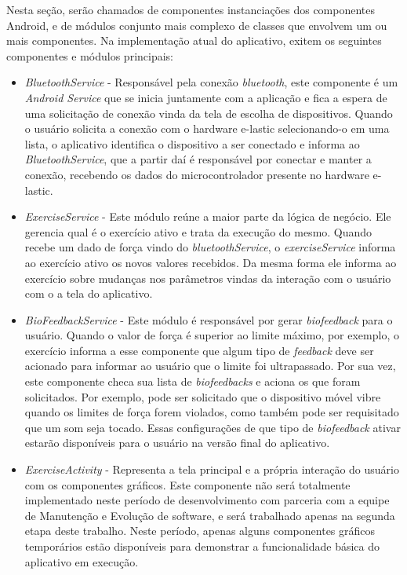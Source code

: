 Nesta seção, serão chamados de componentes instanciações dos componentes Android, e de módulos conjunto mais complexo de classes que envolvem um ou mais componentes. Na implementação atual do aplicativo, exitem os seguintes componentes e módulos principais:
\begin{itemize}
	\item \textit{BluetoothService} - Responsável pela conexão \textit{bluetooth}, este componente é um \textit{Android Service} que se inicia juntamente com a aplicação e fica a espera de uma solicitação de conexão vinda da tela de escolha de dispositivos. Quando o usuário solicita a conexão com o hardware e-lastic selecionando-o em uma lista, o aplicativo identifica o dispositivo a ser conectado e informa ao \textit{BluetoothService}, que a partir daí é responsável por conectar e manter a conexão, recebendo os dados do microcontrolador presente no hardware e-lastic.
	\item \textit{ExerciseService} - Este módulo reúne a maior parte da lógica de negócio. Ele gerencia qual é o exercício ativo e trata da execução do mesmo. Quando recebe um dado de força vindo do \textit{bluetoothService}, o \textit{exerciseService} informa ao exercício ativo os novos valores recebidos. Da mesma forma ele informa ao exercício sobre mudanças nos parâmetros vindas da interação com o usuário com o a tela do aplicativo.
	\item \textit{BioFeedbackService} - Este módulo é responsável por gerar \textit{biofeedback} para o usuário. Quando o valor de força é superior ao limite máximo, por exemplo, o exercício informa a esse componente que algum tipo de \textit{feedback} deve ser acionado para informar ao usuário que o limite foi ultrapassado. Por sua vez, este componente checa sua lista de \textit{biofeedbacks} e aciona os que foram solicitados. Por exemplo, pode ser solicitado que o dispositivo móvel vibre quando os limites de força forem violados, como também pode ser requisitado que um som seja tocado. Essas configurações de que tipo de \textit{biofeedback} ativar estarão disponíveis para o usuário na versão final do aplicativo.  
	\item \textit{ExerciseActivity} - Representa a tela principal e a própria interação do usuário com os componentes gráficos. Este componente não será totalmente implementado neste período de desenvolvimento com parceria com a equipe de Manutenção e Evolução de software, e será trabalhado apenas na segunda etapa deste trabalho. Neste período, apenas alguns componentes gráficos temporários estão disponíveis para demonstrar a funcionalidade básica do aplicativo em execução.
\end{itemize} 

